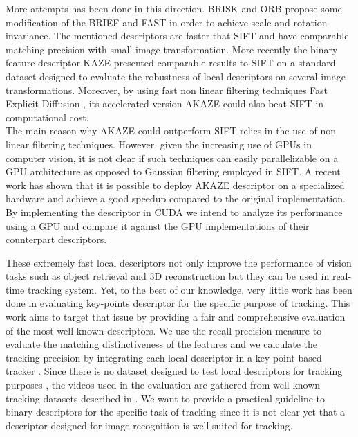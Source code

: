 \documentclass[letterpaper, 10pt, conference]{ieeeconf}
\begin{document}
More attempts has been done in this direction. BRISK \cite{leutenegger11} and ORB \cite{rublee11} propose some modification of the BRIEF and FAST in order to achieve scale and rotation invariance. The mentioned descriptors are faster that SIFT and have comparable matching precision with small image transformation. More recently the binary feature descriptor KAZE \cite{alcantarilla12} presented comparable results to SIFT on a standard dataset \cite{mikolajczyk05} designed to evaluate the robustness of local descriptors on several image transformations. Moreover, by using fast non linear filtering techniques Fast Explicit Diffusion \cite{goesele2010}, its accelerated version AKAZE \cite{alcantarilla13} could also beat SIFT in computational cost.\\
The main reason why AKAZE could outperform SIFT relies in the use of non linear filtering techniques. However, given the increasing use of GPUs in computer vision, it is not clear if such techniques can easily parallelizable on a GPU architecture as opposed to Gaussian filtering employed in SIFT. A recent work \cite{jiang2015} has shown that it is possible to deploy AKAZE descriptor on a specialized hardware and achieve a good speedup compared to the original implementation. By implementing the descriptor in CUDA we intend to analyze its performance using a GPU and compare it against the GPU implementations of their counterpart descriptors.


These extremely fast local descriptors not only improve the performance of vision tasks such as object retrieval and 3D reconstruction but they can be used in real-time tracking system. Yet, to the best of our knowledge, very little work has been done in evaluating key-points descriptor for the specific purpose of tracking. This work aims to target that issue by providing a fair and comprehensive evaluation of the most well known descriptors. We use the recall-precision measure to evaluate the matching distinctiveness of the features and we calculate the tracking precision by integrating each local descriptor in a key-point based tracker \cite{pieropan15}. Since there is no dataset designed to test local descriptors for tracking purposes , the videos used in the evaluation are gathered from well known tracking datasets described in \cite{wu2013,nebehay2014,hare2011}. We want to provide a practical guideline to binary descriptors for the specific task of tracking since it is not clear yet that a descriptor designed for image recognition is well suited for tracking.
 
\end{document}
